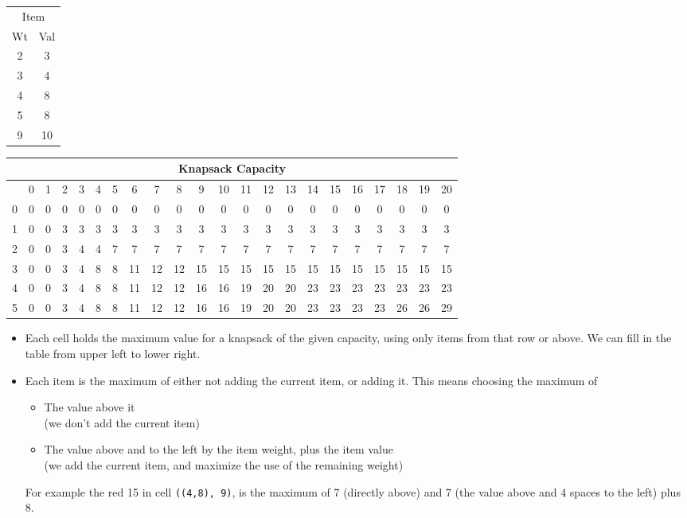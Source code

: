 \documentclass[12pt]{article}
\begin{document}
\Large

\begin{tabular}{cc}
\\
\multicolumn{2}{c}{Item}\\
Wt & Val\\\hline
2 & 3 \\\hline
3 & 4 \\\hline
4 & 8 \\\hline
5 & 8 \\\hline
9 & 10 \\\hline
\end{tabular}
\begin{tabular}{|c|c|c|c|c|c|c|c|c|c|c|c|c|c|c|c|c|c|c|c|c|c|}
\multicolumn{22}{c}{Knapsack Capacity}\\\hline
   &0 &1 &2 &3 &4 &5 &6 &7 &8 &9 &10 &11 &12 &13 &14 &15 &16 &17 &18 &19 &20\\\hline0 &0 &0 &0 &0 &0 &0 &0 &0 &0 &0 &0 &0 &0 &0 &0 &0 &0 &0 &0 &0 &0 \\\hline
1 &0 &0 &3 &3 &3 &3 &3 &3 &3 &3 &3 &3 &3 &3 &3 &3 &3 &3 &3 &3 &3 \\\hline
2 &0 &0 &3 &4 &4 &\color{blue}7 &7 &7 &7 &\color{blue}7 &7 &7 &7 &7 &7 &7 &7 &7 &7 &7 &7 \\\hline
3 &0 &0 &3 &4 &8 &8 &11 &12 &12 &\color{red}15 &15 &15 &15 &15 &15 &15 &15 &15 &15 &15 &15 \\\hline
4 &0 &0 &3 &4 &8 &8 &11 &12 &12 &16 &16 &19 &20 &20 &23 &23 &23 &23 &23 &23 &23 \\\hline
5 &0 &0 &3 &4 &8 &8 &11 &12 &12 &16 &16 &19 &20 &20 &23 &23 &23 &23 &26 &26 &29 \\\hline
\end{tabular}

\begin{itemize}
\item Each cell holds the maximum value for a knapsack of the given
capacity, using only items from that row or above.
We can fill in the table from upper left to lower right.
\item Each item is the maximum of
either not adding the current item, or adding it.  This means choosing
the maximum of
\begin{itemize}
\item The value above it\\(we don't add the current item)
\item The value above and to the left by the item weight, plus the item value \\
(we add the current item, and maximize the use of the remaining weight)
\end{itemize}
For example the red 15 in cell {\tt ((4,8), 9)}, is the maximum of 7 (directly above)
and 7 (the value above and 4 spaces to the left) plus 8.
\end{itemize}
\end{document}
